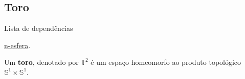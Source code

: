\subsection{Toro}
\label{toro-def}
\begin{titlemize}{Lista de dependências}
	\item \hyperref[n-esfera-def]{n-esfera}. %
\end{titlemize}
\begin{defi}
     Um \textbf{toro}, denotado por $\mathbb{T}^2$ é um espaço homeomorfo ao produto topológico $\mathbb{S}^1\times \mathbb{S}^1$.
\end{defi}
